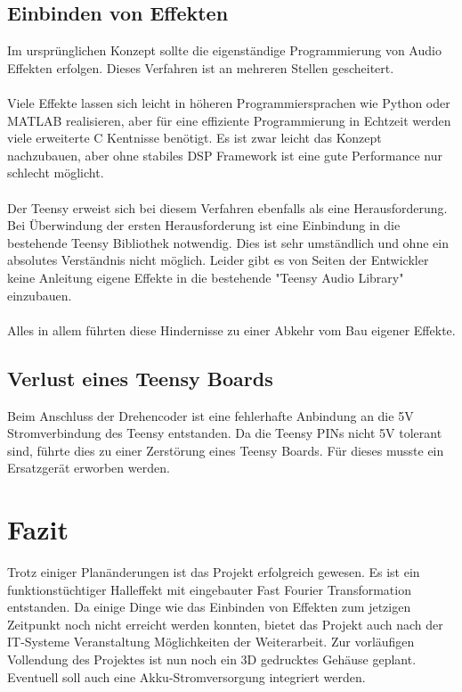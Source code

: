 \documentclass[12pt]{article}
\begin{document}
\subsection{Einbinden von Effekten}
Im ursprünglichen Konzept sollte die eigenständige Programmierung von Audio Effekten erfolgen. 
Dieses Verfahren ist an mehreren Stellen gescheitert. 
\\
\\
Viele Effekte lassen sich leicht in höheren Programmiersprachen
wie Python oder MATLAB realisieren, aber für eine effiziente Programmierung in Echtzeit werden viele erweiterte C Kentnisse benötigt. 
Es ist zwar leicht das Konzept nachzubauen, aber ohne stabiles DSP Framework ist eine gute 
Performance nur schlecht möglicht. 
\\
\\
Der Teensy erweist sich bei diesem Verfahren ebenfalls als eine Herausforderung. Bei Überwindung der ersten Herausforderung 
ist eine Einbindung in die bestehende Teensy Bibliothek notwendig. Dies ist sehr umständlich und ohne ein absolutes Verständnis nicht möglich. 
Leider gibt es von Seiten der Entwickler keine Anleitung eigene Effekte in die bestehende "Teensy Audio Library" einzubauen. 
\\
\\
Alles in allem führten diese Hindernisse zu einer Abkehr vom Bau eigener Effekte.  
\subsection{Verlust eines Teensy Boards}
Beim Anschluss der Drehencoder ist eine fehlerhafte Anbindung an die 5V Stromverbindung des Teensy entstanden. 
Da die Teensy PINs nicht 5V tolerant sind, führte dies zu einer Zerstörung eines Teensy Boards.
Für dieses musste ein Ersatzgerät erworben werden. 

  
\section{Fazit}
Trotz einiger Planänderungen ist das Projekt erfolgreich gewesen. Es ist ein funktionstüchtiger Halleffekt mit eingebauter Fast Fourier Transformation
entstanden.
Da einige Dinge wie das Einbinden von Effekten zum jetzigen Zeitpunkt noch nicht erreicht werden konnten, bietet das Projekt auch nach der IT-Systeme 
Veranstaltung Möglichkeiten der Weiterarbeit. Zur vorläufigen Vollendung des Projektes ist nun noch ein 3D gedrucktes Gehäuse geplant. 
Eventuell soll auch eine Akku-Stromversorgung integriert werden.
\end{document}
